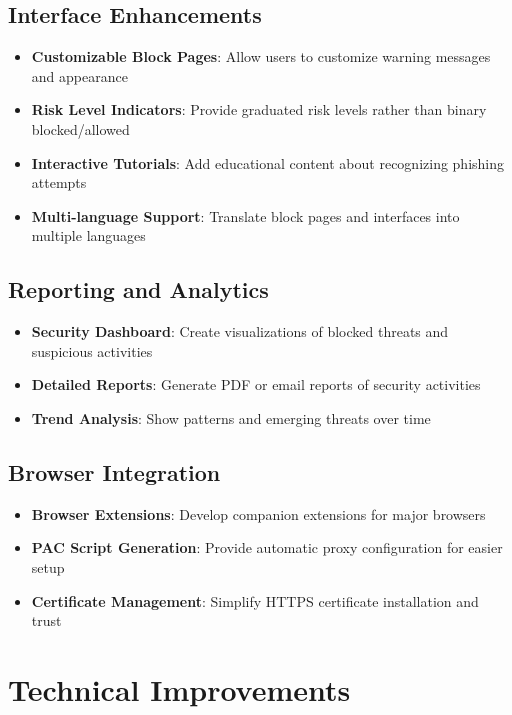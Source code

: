 \subsection{Interface Enhancements}
\begin{itemize}
    \item \textbf{Customizable Block Pages}: Allow users to customize warning messages and appearance
    \item \textbf{Risk Level Indicators}: Provide graduated risk levels rather than binary blocked/allowed
    \item \textbf{Interactive Tutorials}: Add educational content about recognizing phishing attempts
    \item \textbf{Multi-language Support}: Translate block pages and interfaces into multiple languages
\end{itemize}

\subsection{Reporting and Analytics}
\begin{itemize}
    \item \textbf{Security Dashboard}: Create visualizations of blocked threats and suspicious activities
    \item \textbf{Detailed Reports}: Generate PDF or email reports of security activities
    \item \textbf{Trend Analysis}: Show patterns and emerging threats over time
\end{itemize}

\subsection{Browser Integration}
\begin{itemize}
    \item \textbf{Browser Extensions}: Develop companion extensions for major browsers
    \item \textbf{PAC Script Generation}: Provide automatic proxy configuration for easier setup
    \item \textbf{Certificate Management}: Simplify HTTPS certificate installation and trust
\end{itemize}

\section{Technical Improvements}

